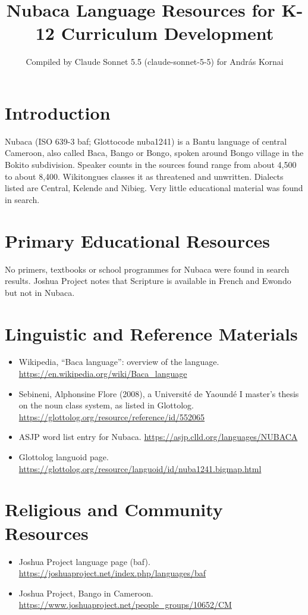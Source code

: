 \documentclass[12pt]{article}
\title{Nubaca Language Resources for K-12 Curriculum Development}
\author{Compiled by Claude Sonnet 5.5 (claude-sonnet-5-5) for Andr\'as Kornai}
\date{}
\begin{document}
\maketitle

\section{Introduction}
Nubaca (ISO 639-3 baf; Glottocode nuba1241) is a Bantu language of central Cameroon, also called Baca, Bango or Bongo, spoken around Bongo village in the Bokito subdivision. Speaker counts in the sources found range from about 4,500 to about 8,400. Wikitongues classes it as threatened and unwritten. Dialects listed are Central, Kelende and Nibieg. Very little educational material was found in search.

\section{Primary Educational Resources}
No primers, textbooks or school programmes for Nubaca were found in search results. Joshua Project notes that Scripture is available in French and Ewondo but not in Nubaca.

\section{Linguistic and Reference Materials}
\begin{itemize}
\item Wikipedia, ``Baca language'': overview of the language. \url{https://en.wikipedia.org/wiki/Baca_language}
\item Sebineni, Alphonsine Flore (2008), a Universit\'e de Yaound\'e I master's thesis on the noun class system, as listed in Glottolog. \url{https://glottolog.org/resource/reference/id/552065}
\item ASJP word list entry for Nubaca. \url{https://asjp.clld.org/languages/NUBACA}
\item Glottolog languoid page. \url{https://glottolog.org/resource/languoid/id/nuba1241.bigmap.html}
\end{itemize}

\section{Religious and Community Resources}
\begin{itemize}
\item Joshua Project language page (baf). \url{https://joshuaproject.net/index.php/languages/baf}
\item Joshua Project, Bango in Cameroon. \url{https://www.joshuaproject.net/people_groups/10652/CM}
\end{itemize}
\end{document}
